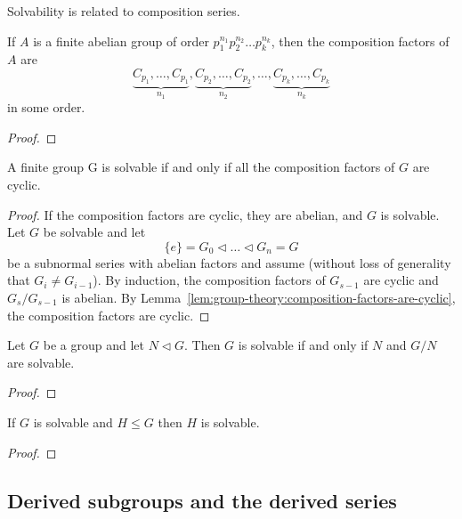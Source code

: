 Solvability is related to composition series.

\begin{lemma}\label{lem:group-theory:composition-factors-are-cyclic}
  If \(A\) is a finite abelian group of order \(p_{1}^{n_{1}} p_{2}^{n_{2}} \ldots p_{k}^{n_{k}}\), then the composition factors of \(A\) are
  \[\underbrace{C_{p_{1}}, \ldots, C_{p_{1}}}_{n_{1}} , \underbrace{C_{p_{2}}, \ldots, C_{p_{2}}}_{n_{2}} , \ldots , \underbrace{C_{p_{k}}, \ldots, C_{p_{k}}}_{n_{k}}\]
  in some order.
\end{lemma}

\begin{proof}
\end{proof}

\begin{theorem}
  A finite group G is solvable if and only if all the composition factors of \(G\) are cyclic.
\end{theorem}

\begin{proof}
  If the composition factors are cyclic, they are abelian, and \(G\) is solvable. Let \(G\) be solvable and let
  \[\{e\} = G_{0} \triangleleft \ldots \triangleleft G_{n} = G\]
  be a subnormal series with abelian factors and assume (without loss of generality that \(G_{i} \neq G_{i-1}\)). By induction, the composition factors of \(G_{s-1}\) are cyclic and \(G_{s}/G_{s-1}\) is abelian. By Lemma~\ref{lem:group-theory:composition-factors-are-cyclic}, the composition factors are cyclic.
\end{proof}

\begin{theorem}
  Let \(G\) be a group and let \(N \triangleleft G\). Then \(G\) is solvable if and only if \(N\) and \(G/N\) are solvable.
\end{theorem}

\begin{proof}
\end{proof}

\begin{theorem}
  If \(G\) is solvable and \(H \leq G\) then \(H\) is solvable.
\end{theorem}

\begin{proof}
\end{proof}

\subsection{Derived subgroups and the derived series}


